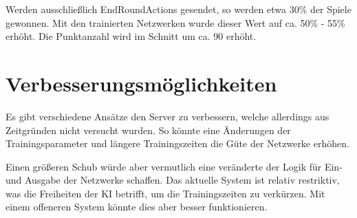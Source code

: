 \documentclass[11pt, twocolumn]{article}
\begin{document}
Werden ausschließlich EndRoundActions gesendet, so werden etwa 30\% der Spiele gewonnen. Mit den trainierten Netzwerken wurde dieser Wert auf ca. 50\% - 55\% erhöht. Die Punktanzahl wird im Schnitt um ca. 90 erhöht.


\section{Verbesserungsmöglichkeiten}
Es gibt verschiedene Ansätze den Server zu verbessern, welche allerdings aus Zeitgründen nicht versucht wurden. So könnte eine Änderungen der Trainingsparameter und längere Trainingszeiten die Güte der Netzwerke erhöhen.

Einen größeren Schub würde aber vermutlich eine veränderte der Logik für Ein- und Ausgabe der Netzwerke schaffen. Das aktuelle System ist relativ restriktiv, was die Freiheiten der KI betrifft, um die Trainingszeiten zu verkürzen. Mit einem offeneren System könnte dies aber besser funktionieren.
\end{document}
